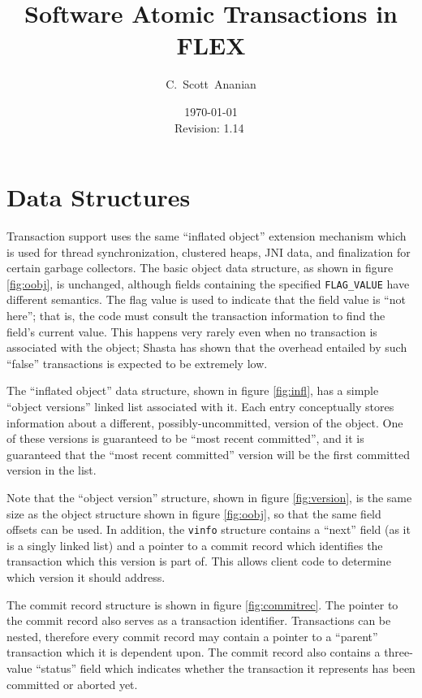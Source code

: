 \documentclass[11pt,notitlepage]{article}
\author{C.~Scott~Ananian}
\title{Software Atomic Transactions in FLEX}
\date{\today \\ $ $Revision: 1.14 $ $}
\begin{document}

\maketitle
\section{Data Structures}

Transaction support uses the same ``inflated object'' extension
mechanism which is used for thread synchronization, clustered heaps,
JNI data, and finalization for certain garbage collectors.
The basic object data structure, as shown in figure \ref{fig:oobj}, is
unchanged, although fields containing the specified
\texttt{FLAG\_VALUE} have different semantics.  The flag value is used
to indicate that the field value is ``not here''; that is, the code
must consult the transaction information to find the field's current
value.  This happens very rarely even when no transaction is
associated with the object; Shasta \cite{scales96:shasta} has shown that the
overhead entailed by such ``false'' transactions is expected to be
extremely low.

The ``inflated object'' data structure, shown in figure
\ref{fig:infl}, has a simple ``object versions'' linked list associated with
it.  Each entry conceptually stores information about a different,
possibly-uncommitted, version of the object.  One of these versions is
guaranteed to be ``most recent committed'', and it is guaranteed that
the ``most recent committed'' version will be the first committed
version in the list.

Note that the ``object version'' structure, shown in figure
\ref{fig:version}, is the same size as the object structure shown in
figure \ref{fig:oobj}, so that the same field offsets can be used.
In addition, the \texttt{vinfo} structure contains a ``next'' field
(as it is a singly linked list) and a pointer to a commit record which
identifies the transaction which this version is part of.  This allows
client code to determine which version it should address.

The commit record structure is shown in figure \ref{fig:commitrec}.
The pointer to the commit record also serves as a transaction
identifier.  Transactions can be nested, therefore every commit record
may contain a pointer to a ``parent'' transaction which it is
dependent upon.  The commit record also contains a three-value
``status'' field which indicates whether the transaction it represents
has been committed or aborted yet.
\end{document}
